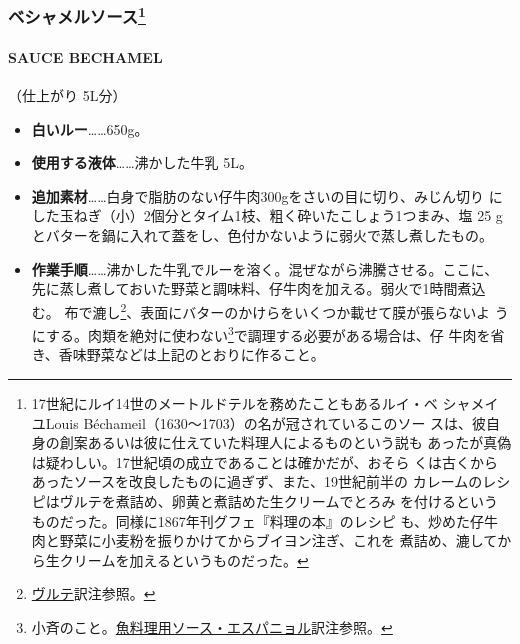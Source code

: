 \hypertarget{ux30d9ux30b7ux30e3ux30e1ux30ebux30bdux30fcux30b9102020}{%
\subsubsection[ベシャメルソース]{\texorpdfstring{ベシャメルソース\footnote{17世紀にルイ14世のメートルドテルを務めたこともあるルイ・ベ
  シャメイユLouis Béchameil（1630〜1703）の名が冠されているこのソー
  スは、彼自身の創案あるいは彼に仕えていた料理人によるものという説も
  あったが真偽は疑わしい。17世紀頃の成立であることは確かだが、おそら
  くは古くからあったソースを改良したものに過ぎず、また、19世紀前半の
  カレームのレシピはヴルテを煮詰め、卵黄と煮詰めた生クリームでとろみ
  を付けるというものだった。同様に1867年刊グフェ『料理の本』のレシピ
  も、炒めた仔牛肉と野菜に小麦粉を振りかけてからブイヨン注ぎ、これを
  煮詰め、漉してから生クリームを加えるというものだった。}}{ベシャメルソース}}\label{ux30d9ux30b7ux30e3ux30e1ux30ebux30bdux30fcux30b9102020}}

\hypertarget{sauce-bechamel}{%
\paragraph{SAUCE BECHAMEL}\label{sauce-bechamel}}


（仕上がり 5L分）

\begin{itemize}
\item
  \textbf{白いルー}\ldots{}\ldots{}650g。
\item
  \textbf{使用する液体}\ldots{}\ldots{}沸かした牛乳 5L。
\item
  \textbf{追加素材}\ldots{}\ldots{}白身で脂肪のない仔牛肉300gをさいの目に切り、みじん切り
  にした玉ねぎ（小）2個分とタイム1枝、粗く砕いたこしょう1つまみ、塩 25
  gとバターを鍋に入れて蓋をし、色付かないように弱火で蒸し煮したもの。
\item
  \textbf{作業手順}\ldots{}\ldots{}沸かした牛乳でルーを溶く。混ぜながら沸騰させる。ここに、
  先に蒸し煮しておいた野菜と調味料、仔牛肉を加える。弱火で1時間煮込む。
  布で漉し\footnote{\protect\hyperlink{veloute}{ヴルテ}訳注参照。}、表面にバターのかけらをいくつか載せて膜が張らないよ
  うにする。肉類を絶対に使わない\footnote{小斉のこと。\protect\hyperlink{sauce-espagnole-maigre}{魚料理用ソース・エスパニョル}訳注参照。}で調理する必要がある場合は、仔
  牛肉を省き、香味野菜などは上記のとおりに作ること。
\end{itemize}


